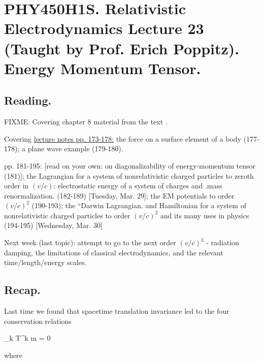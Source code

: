 
%

\chapter{PHY450H1S.  Relativistic Electrodynamics Lecture 23 (Taught by Prof. Erich Poppitz).  Energy Momentum Tensor.}
\label{chap:relativisticElectrodynamicsL23}
{}
\date{Mar 29, 2011}

\beginArtNoToc

\section{Reading.}

FIXME:
Covering chapter 8 material from the text \cite{landau1980classical}.

Covering \href{http://www.physics.utoronto.ca/~poppitz/epoppitz/PHY450_files/RelEMpp166-180.pdf}{lecture notes pp. 173-178:} the force on a surface element of a body (177-178); a plane wave example (179-180).

pp. 181-195: [read on your own: on diagonalizability of energy-momentum tensor (181)]; the Lagrangian for a system of nonrelativistic charged particles to zeroth order in $(v/c)$: electrostatic energy of a system of charges and .mass renormalization. (182-189) [Tuesday, Mar. 29]; the EM potentials to order $(v/c)^2$ (190-193); the ``Darwin Lagrangian.  and Hamiltonian for a system of nonrelativistic charged particles to order $(v/c)^2$ and its many uses in physics (194-195) [Wednesday, Mar. 30]

Next week (last topic): attempt to go to the next order $(v/c)^3$ - radiation damping, the limitations of classical electrodynamics, and the relevant time/length/energy scales.

\section{Recap.}

Last time we found that spacetime translation invariance led to the four conservation relations

\partial_k T^{k m} = 0

where

